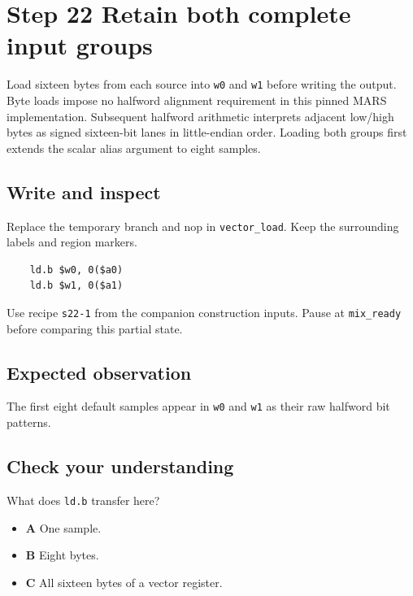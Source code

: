 \section{Step 22 Retain both complete input groups}\label{pcm-s22}

Load sixteen bytes from each source into \texttt{w0} and \texttt{w1} before writing the output. Byte loads impose no halfword alignment requirement in this pinned MARS implementation. Subsequent halfword arithmetic interprets adjacent low/high bytes as signed sixteen-bit lanes in little-endian order. Loading both groups first extends the scalar alias argument to eight samples.

\subsection{Write and inspect}
Replace the temporary branch and nop in \texttt{vector\_load}. Keep the surrounding labels and region markers.

\begin{verbatim}
    ld.b $w0, 0($a0)
    ld.b $w1, 0($a1)
\end{verbatim}
Use recipe \texttt{s22-1} from the companion construction inputs. Pause at \texttt{mix\_ready} before comparing this partial state.

\subsection{Expected observation}
The first eight default samples appear in \texttt{w0} and \texttt{w1} as their raw halfword bit patterns.

\subsection{Check your understanding}
What does \texttt{ld.b} transfer here?

\begin{itemize}
  \item \textbf{A} One sample.
  \item \textbf{B} Eight bytes.
  \item \textbf{C} All sixteen bytes of a vector register.
\end{itemize}
